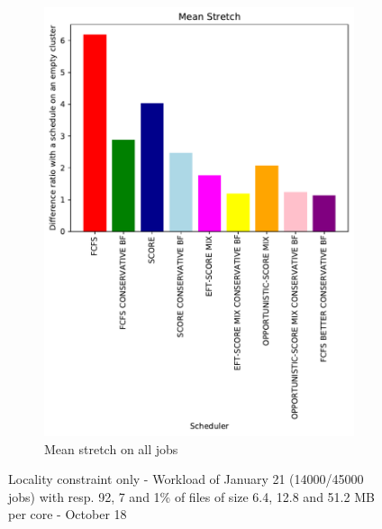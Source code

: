 \documentclass[a4paper]{article}
\begin{document}
\begin{figure}[H]
\begin{subfigure}[b]{0.4\linewidth}\centering\includegraphics[width=0.9\linewidth]{MBSS/plot/Results_FCFS_Score_Backfill_2022-01-21->2022-01-21_V9271_Mean_Stretch_450_128_32_256_4_1024.pdf}\caption{Mean stretch on all jobs}\end{subfigure}
\caption{Locality constraint only - Workload of January 21 (14000/45000 jobs) with resp. 92, 7 and 1\% of files of size 6.4, 12.8 and 51.2 MB per core - October 18}\end{figure}
\end{document}
